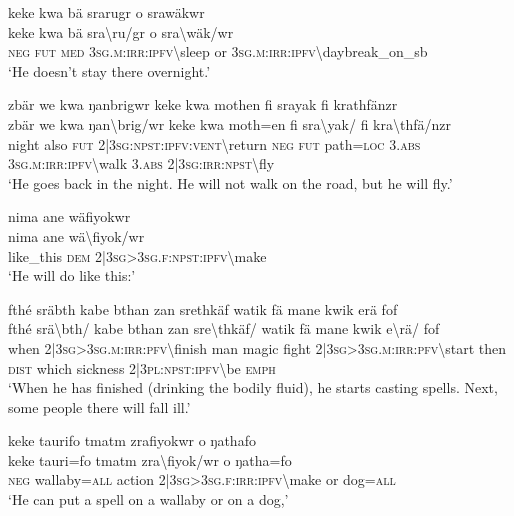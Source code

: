 \ea\label{ex:a4360}
keke kwa bä srarugr o srawäkwr\\
\gll keke	kwa	bä	sra{\textbackslash}ru/gr	o	sra{\textbackslash}wäk/wr\\
     \textsc{neg}	\textsc{fut}	\textsc{med}	3\textsc{sg}.\textsc{m}:\textsc{irr}:\textsc{ipfv}{\textbackslash}sleep	or	3\textsc{sg}.\textsc{m}:\textsc{irr}:\textsc{ipfv}{\textbackslash}daybreak\_on\_sb\\
\glt `He doesn't stay there overnight.'
\z

\ea\label{ex:a4361}
zbär we kwa ŋanbrigwr keke kwa mothen fi srayak fi krathfänzr\\
\gll zbär	we	kwa	ŋan{\textbackslash}brig/wr	keke	kwa	moth=en	fi	sra{\textbackslash}yak/	fi	kra{\textbackslash}thfä/nzr\\
     night	also	\textsc{fut}	2|3\textsc{sg}:\textsc{npst}:\textsc{ipfv}:\textsc{vent}{\textbackslash}return	\textsc{neg}	\textsc{fut}	path=\textsc{loc}	3.\textsc{abs}	3\textsc{sg}.\textsc{m}:\textsc{irr}:\textsc{ipfv}{\textbackslash}walk	3.\textsc{abs}	2|3\textsc{sg}:\textsc{irr}:\textsc{npst}{\textbackslash}fly\\
\glt `He goes back in the night. He will not walk on the road, but he will fly.'
\z

\ea\label{ex:a4362}
nima ane wäfiyokwr\\
\gll nima	ane	wä{\textbackslash}fiyok/wr\\
     like\_this	\textsc{dem}	2|3\textsc{sg}>3\textsc{sg}.\textsc{f}:\textsc{npst}:\textsc{ipfv}{\textbackslash}make\\
\glt `He will do like this:'
\z

\ea\label{ex:a4363}
fthé sräbth kabe bthan zan srethkäf watik fä mane kwik erä fof\\
\gll fthé	srä{\textbackslash}bth/	kabe	bthan	zan	sre{\textbackslash}thkäf/	watik	fä	mane	kwik	e{\textbackslash}rä/	fof\\
     when	2|3\textsc{sg}>3\textsc{sg}.\textsc{m}:\textsc{irr}:\textsc{pfv}{\textbackslash}finish	man	magic	fight	2|3\textsc{sg}>3\textsc{sg}.\textsc{m}:\textsc{irr}:\textsc{pfv}{\textbackslash}start	then	\textsc{dist}	which	sickness	2|3\textsc{pl}:\textsc{npst}:\textsc{ipfv}{\textbackslash}be	\textsc{emph}\\
\glt `When he has finished (drinking the bodily fluid), he starts casting spells. Next, some people there will fall ill.'
\z

\ea\label{ex:a4364}
keke taurifo tmatm zrafiyokwr o ŋathafo\\
\gll keke	tauri=fo	tmatm	zra{\textbackslash}fiyok/wr	o	ŋatha=fo\\
     \textsc{neg}	wallaby=\textsc{all}	action	2|3\textsc{sg}>3\textsc{sg}.\textsc{f}:\textsc{irr}:\textsc{ipfv}{\textbackslash}make	or	dog=\textsc{all}\\
\glt `He can put a spell on a wallaby or on a dog,'
\z

